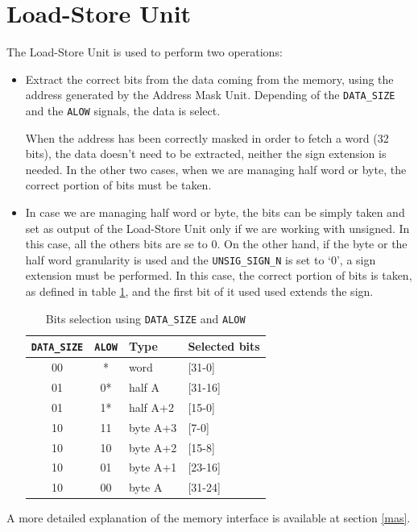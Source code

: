 \section{Load-Store Unit}
The Load-Store Unit is used to perform two operations:
\begin{itemize}
	\item Extract the correct bits from the data coming from the memory, using the address generated by the Address Mask Unit. Depending of the \texttt{DATA\_SIZE} and the \texttt{ALOW} signals, the data is select.
	
	When the address has been correctly masked in order to fetch a word (32 bits), the data doesn't need to be extracted, neither the sign extension is needed. In the other two cases, when we are managing half word or byte, the correct portion of bits must be taken. 

	\item In case we are managing half word or byte, the bits can be simply taken and set as output of the Load-Store Unit only if we are working with unsigned. In this case, all the others bits are se to 0. On the other hand, if the byte or the half word granularity is used and the \texttt{UNSIG\_SIGN\_N} is set to `0', a sign extension must be performed. In this case, the correct portion of bits is taken, as defined in table \ref{tab:addr_selection}, and the first bit of it used used extends the sign. 
	\begin{table}[H]
		\begin{center}
			\begin{tabular}{ |c| c | l | l|}
				\hline
				\texttt{DATA\_SIZE} & \texttt{ALOW} & \textbf{Type} & \textbf{Selected bits}\\
				\hline
				00 & * & word & [31-0]\\
				01 & 0* & half A & [31-16]\\
				01 & 1* & half A+2 & [15-0]\\
				10 & 11 & byte A+3 & [7-0]\\
				10 & 10 & byte A+2 & [15-8]\\
				10 & 01 & byte A+1 & [23-16]\\
				10 & 00 & byte A & [31-24]\\
				\hline
				
			\end{tabular}
			\caption{Bits selection using \texttt{DATA\_SIZE} and \texttt{ALOW}}
			\label{tab:addr_selection}
		\end{center}
	\end{table}

	
\end{itemize}
A more detailed explanation of the memory interface is available at section \ref{mas}.
